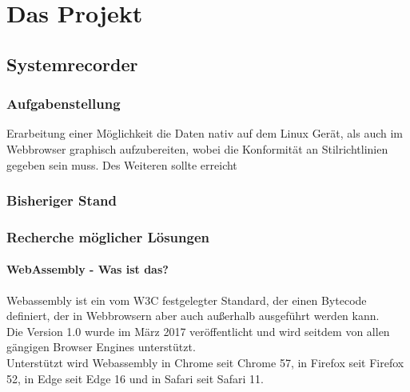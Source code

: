 \chapter{Das Projekt}

\section{Systemrecorder}
\subsection{Aufgabenstellung}
Erarbeitung einer Möglichkeit die Daten nativ auf dem Linux Gerät, als auch im Webbrowser graphisch aufzubereiten, wobei die Konformität an Stilrichtlinien gegeben sein muss.
Des Weiteren sollte erreicht 
\subsection{Bisheriger Stand}
\subsection{Recherche möglicher Lösungen}
\subsubsection{WebAssembly - Was ist das?}
Webassembly ist ein vom W3C festgelegter Standard, der einen Bytecode definiert, der in Webbrowsern aber auch außerhalb ausgeführt werden kann. \\
Die Version 1.0 wurde im März 2017 veröffentlicht und wird seitdem von allen gängigen Browser Engines unterstützt. \\
Unterstützt wird Webassembly in Chrome seit Chrome 57, in Firefox seit Firefox 52, in Edge seit Edge 16 und in Safari seit Safari 11. \\
